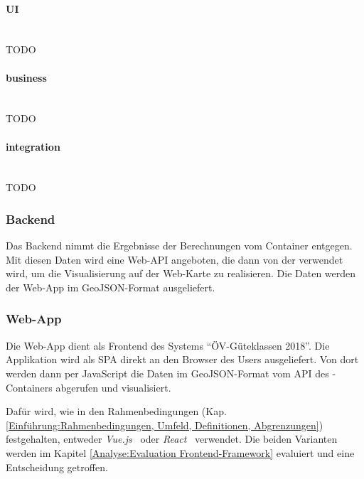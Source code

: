
\paragraph{UI}~\\
TODO

\paragraph{business}~\\
TODO


\paragraph{integration}~\\
TODO

\subsubsection{Backend}
\label{container:Backend}

Das Backend nimmt die Ergebnisse der Berechnungen vom Container  entgegen.
Mit diesen Daten wird eine Web-\ac{API} angeboten, die dann von der  verwendet wird, um die Visualisierung auf der Web-Karte zu realisieren.
Die Daten werden der Web-App im \gls{GeoJSON}-Format ausgeliefert.


\subsubsection{Web-App}
\label{container:Web-App}

Die Web-App dient als Frontend des Systems "`\acs{ÖV}-Güteklassen 2018"'.
Die Applikation wird als \ac{SPA} direkt an den Browser des Users ausgeliefert.
Von dort werden dann per JavaScript die Daten im \gls{GeoJSON}-Format vom \ac{API} des -Containers abgerufen und visualisiert.

Dafür wird, wie in den Rahmenbedingungen (Kap. \ref{Einführung:Rahmenbedingungen, Umfeld, Definitionen, Abgrenzungen}) festgehalten, entweder \emph{Vue.js}~\cite{vuejs} oder \emph{React}~\cite{react} verwendet.
Die beiden Varianten werden im Kapitel \ref{Analyse:Evaluation Frontend-Framework} evaluiert und eine Entscheidung getroffen.


